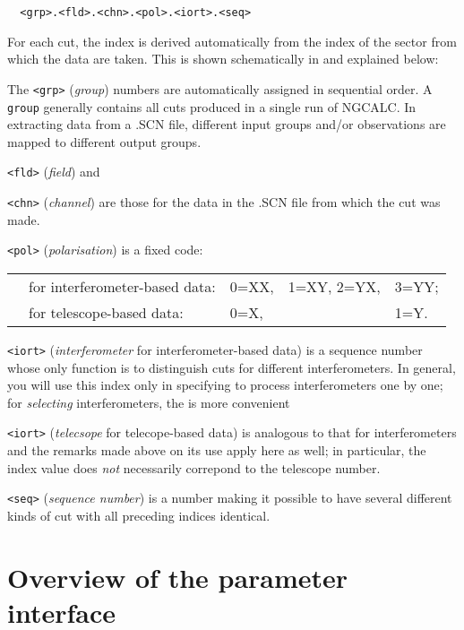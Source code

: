 \verb/  <grp>.<fld>.<chn>.<pol>.<iort>.<seq>/

For each cut, the index is derived automatically from the index of the sector
from which the data are taken. This is shown schematically in 
 and explained below: 

 

\bi 
\item   The \verb/<grp>/ ({\em group}\/) numbers are automatically assigned in
sequential order. A \verb/group/ generally contains all cuts produced in a
single run of NGCALC. In extracting data from a .SCN file, different input
groups and/or observations are mapped to different output groups. 
% 
\item   \verb/<fld>/ ({\em field}\/) and 
% 
\item   \verb/<chn>/ ({\em channel}\/) are those for the data in the .SCN file
from which the cut was made. 
% 
\item   \verb/<pol>/ ({\em polarisation}\/) is a fixed code: 

\begin{tabular}{lllll} 
        &for interferometer-based data: &0=XX,  &1=XY, 2=YX,    &3=YY; \\ 
        &for telescope-based data:      &0=X,   &               &1=Y. 
\end{tabular} 

\item   \verb/<iort>/ ({\em interferometer}\/ for interferometer-based data) is
a sequence number whose only function is to distinguish cuts for different
interferometers. In general, you will use this index only in specifying
 to process interferometers one by one; for {\em
selecting}\/ interferometers, the  is more
convenient 
% 
\item   \verb/<iort>/ ({\em telecsope}\/ for telecope-based data) is analogous
to that for interferometers and the remarks made above on its use apply here as
well; in particular, the index value does {\em not}\/ necessarily correpond to
the telescope number. 
% 
\item   \verb/<seq>/ ({\em sequence number}\/) is a number making it possible
to have several different kinds of cut with all preceding indices identical. 
% 
\ei 


\section{ Overview of the parameter interface } 


